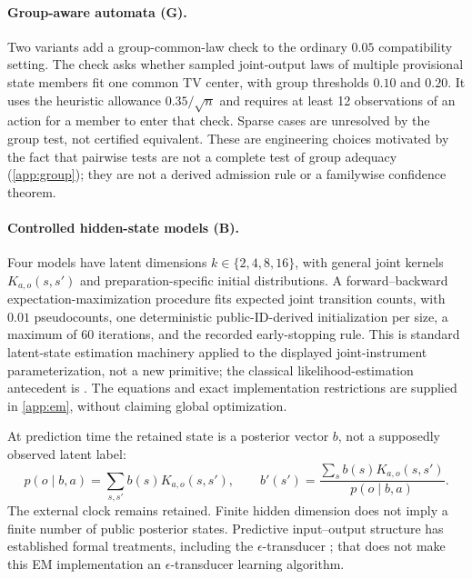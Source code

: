 \paragraph{Group-aware automata (G).}
Two variants add a group-common-law check to the ordinary $0.05$ compatibility setting. The check asks whether sampled joint-output laws of multiple provisional state members fit one common TV center, with group thresholds $0.10$ and $0.20$. It uses the heuristic allowance $0.35/\sqrt n$ and requires at least 12 observations of an action for a member to enter that check. Sparse cases are unresolved by the group test, not certified equivalent. These are engineering choices motivated by the fact that pairwise tests are not a complete test of group adequacy (\cref{app:group}); they are not a derived admission rule or a familywise confidence theorem.

\paragraph{Controlled hidden-state models (B).}
Four models have latent dimensions $k\in\{2,4,8,16\}$, with general joint kernels $K_{a,o}(s,s')$ and preparation-specific initial distributions. A forward--backward expectation-maximization procedure fits expected joint transition counts, with $0.01$ pseudocounts, one deterministic public-ID-derived initialization per size, a maximum of 60 iterations, and the recorded early-stopping rule. This is standard latent-state estimation machinery applied to the displayed joint-instrument parameterization, not a new \RJC{} primitive; the classical likelihood-estimation antecedent is \cite{Baum1970}. The equations and exact implementation restrictions are supplied in \cref{app:em}, without claiming global optimization.

At prediction time the retained state is a posterior vector $b$, not a supposedly observed latent label:
\begin{equation}
 p(o\mid b,a)=\sum_{s,s'}b(s)K_{a,o}(s,s'),\qquad
 b'(s')=\frac{\sum_s b(s)K_{a,o}(s,s')}{p(o\mid b,a)}.
 \label{eq:belief}
\end{equation}
The external clock remains retained. Finite hidden dimension does not imply a finite number of public posterior states. Predictive input--output structure has established formal treatments, including the $\epsilon$-transducer \cite{Barnett2015}; that does not make this EM implementation an $\epsilon$-transducer learning algorithm.

